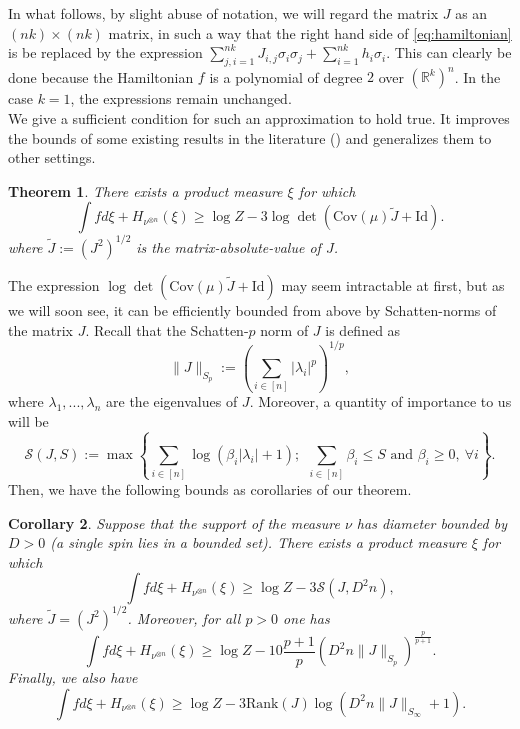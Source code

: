 \documentclass[12pt]{article}
\def \RR {\mathbb R}
\def \Cov {\mathrm {Cov}}
\def \Id {\mathrm{Id}}
\def \Cov {\mathrm{Cov}}
\newtheorem{theorem}{Theorem}
\newtheorem{corollary}[theorem]{Corollary}
\theoremstyle{definition}
\theoremstyle{remark}
\begin{document}
In what follows, by slight abuse of notation, we will regard the matrix $J$ as an $(nk) \times (nk)$ matrix, in such a way that the right hand side of \eqref{eq:hamiltonian} is be replaced by the expression $\sum_{j,i=1}^{nk} J_{i,j} \sigma_i \sigma_j  + \sum_{i=1}^{nk} h_i \sigma_i$. This can clearly be done because the Hamiltonian $f$ is a polynomial of degree $2$ over $(\RR^k)^n$. In the case $k=1$, the expressions remain unchanged. \\

We give a sufficient condition for such an approximation to hold true. It improves the bounds of some existing results in the literature (\cite{BM16,Eldan-GWComplexity,pmlr-v75-jain18b,JKR18,Aug18}) and generalizes them to other settings.

\begin{theorem} \label{thm:meanfield}
There exists a product measure $\xi$ for which 
\begin{equation}\label{eq:main-mf}
\int f d \xi + H_{\nu^{\otimes n}} (\xi) \geq \log Z - 3 \log \det \left  (\Cov(\mu) \tilde J + \Id \right ).
\end{equation}
where $\tilde J := (J^2)^{1/2}$ is the matrix-absolute-value of $J$. 
\end{theorem}

The expression $\log \det (\Cov(\mu) \tilde J + \Id)$ may seem intractable at first, but as we will soon see, it can be efficiently bounded from above by Schatten-norms of the matrix $J$. Recall that the Schatten-$p$ norm of $J$ is defined as
$$
\| J \|_{S_p} := \left (\sum_{i \in [n]} |\lambda_i|^p \right )^{1/p},
$$
where $\lambda_1,...,\lambda_n$ are the eigenvalues of $J$. Moreover, a quantity of importance to us will be
$$
\mathcal{S}(J, S) := \max \left  \{ \sum_{i \in [n]} \log( \beta_i |\lambda_i| + 1); ~~ \sum_{i \in [n]} \beta_i \leq S \mbox{ and } \beta_i \geq 0, ~ \forall i \right \}.
$$
Then, we have the following bounds as corollaries of our theorem.

\begin{corollary} \label{cor:mf}
Suppose that the support of the measure $\nu$ has diameter bounded by $D > 0$ (a single spin lies in a bounded set). There exists a product measure $\xi$ for which 
\begin{equation}\label{eq:corr1}
\int f d \xi + H_{\nu^{\otimes n}} (\xi) \geq \log Z - 3 \mathcal{S}(J, D^2 n),
\end{equation}
where $\tilde J = (J^2)^{1/2}$. Moreover, for all $p>0$ one has
\begin{equation}\label{eq:schatten}
\int f d \xi + H_{\nu^{\otimes n}} (\xi)  \geq \log Z - 10 \frac{p + 1}{p} \left ( D^2 n \|J\|_{S_p} \right )^{\frac{p}{p+1}}.
\end{equation}
Finally, we also have
\begin{equation}\label{eq:rank}
\int f d \xi + H_{\nu^{\otimes n}} (\xi)  \geq \log Z - 3 \mathrm{Rank}(J) \log \left ( D^2 n \|J\|_{S_\infty} + 1 \right ).
\end{equation}
\end{corollary}
\end{document}
